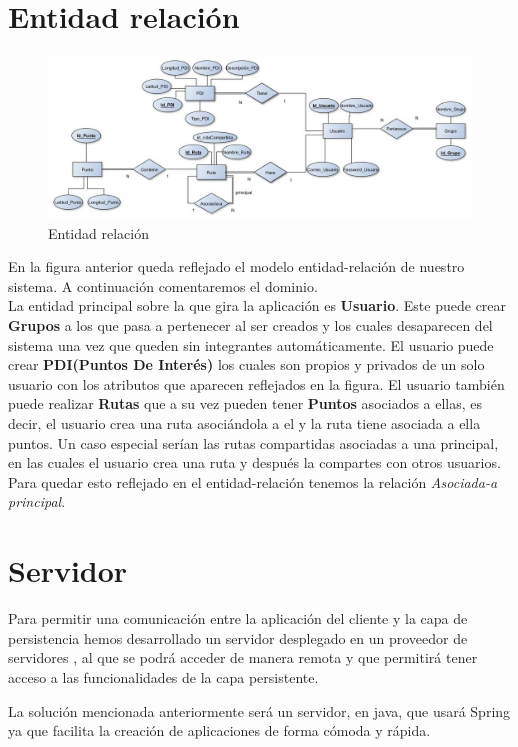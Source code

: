\section{Entidad relación}
\begin{figure}[H]
		\centering
		\includegraphics[width=\textwidth] {BD.jpg}
		\caption{Entidad relación  }\label{fig:BD}
	\end{figure}
	En la figura anterior queda reflejado el modelo  entidad-relación de nuestro sistema. A continuación comentaremos el dominio.\\
La entidad principal sobre la que gira la aplicación es \textbf{Usuario}. Este puede crear \textbf{Grupos} a los que pasa a pertenecer al ser creados y los cuales desaparecen del sistema una vez que queden sin integrantes automáticamente.  El usuario puede crear \textbf{PDI(Puntos De Interés)} los cuales son propios y privados de un solo usuario con los atributos que aparecen reflejados en la figura. El usuario también puede realizar \textbf{Rutas} que a su vez pueden tener \textbf{Puntos} asociados a ellas, es decir, el  usuario crea una ruta asociándola a el y la ruta tiene asociada a ella puntos.
 Un caso especial serían las rutas compartidas asociadas a una principal, en las cuales el usuario crea una ruta y después la compartes con otros usuarios. Para  quedar esto reflejado en el entidad-relación tenemos la relación \textit{Asociada-a principal}.
	
\section{Servidor}
Para permitir una comunicación entre la aplicación del cliente y la capa de persistencia hemos desarrollado un servidor desplegado en un proveedor de servidores , al que se podrá acceder de manera remota y que permitirá tener acceso a las funcionalidades de la capa persistente.

La solución mencionada anteriormente será un servidor, en java, que  usará Spring ya que facilita la creación de aplicaciones de forma cómoda y rápida.\\

